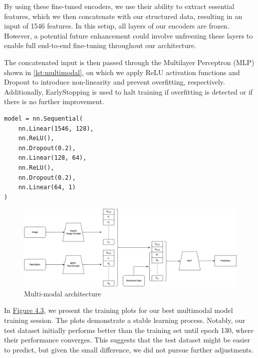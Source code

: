 By using these fine-tuned encoders, we use their ability to extract essential features, which we then concatenate with our structured data, resulting in an input of 1546 features. In this setup, all layers of our encoders are frozen. However, a potential future enhancement could involve unfreezing these layers to enable full end-to-end fine-tuning throughout our architecture.

The concatenated input is then passed through the Multilayer Perceptron (MLP) shown in \autoref{lst:multimodal}, on which we apply ReLU activation functions and Dropout to introduce non-linearity and prevent overfitting, respectively. Additionally, EarlyStopping is used to halt training if overfitting is detected or if there is no further improvement.

\begin{lstlisting}[label={lst:multimodal}]
model = nn.Sequential(
    nn.Linear(1546, 128),
    nn.ReLU(),
    nn.Dropout(0.2),
    nn.Linear(128, 64),
    nn.ReLU(),
    nn.Dropout(0.2),
    nn.Linear(64, 1)
)
\end{lstlisting}


\begin{figure}[ht]
    \centering
    \includegraphics[width=\linewidth]{images/priceprediction/model/arch.png}
    \caption{Multi-modal architecture}
    \label{fig:model-architecture}
\end{figure}

In \hyperref[fig:multimodal-results]{Figure 4.3}, we present the training plots for our best multimodal model training session. The plots demonstrate a stable learning process. Notably, our test dataset initially performs better than the training set until epoch 130, where their performance converges. This suggests that the test dataset might be easier to predict, but given the small difference, we did not pursue further adjustments.

